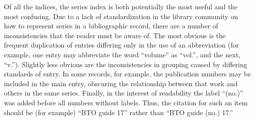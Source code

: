 Of all the indices, the series index is both potentially the most useful and
the most confusing. Due to a lack of standardization in the library community
on how to represent series in a bibliographic record, there are a number of
inconsistencies that the reader must be aware of. The most obvious is the
frequent duplication of entries differing only in the use of an abbreviation
(for example, one entry may abbreviate the word ``volume'' as ``vol.'', and the
next, ``v.''). Slightly less obvious are the inconsistencies in grouping caused
by differing standards of entry. In some records, for example, the publication
numbers may be included in the main entry, obscuring the relationship between that
work and others in the same series. Finally, in the interest of readability the
label ``(no.)'' was added before all numbers without labels. Thus, the citation
for such an item should be (for example) ``BTO guide 17'' rather than ``BTO guide
(no.) 17.''
